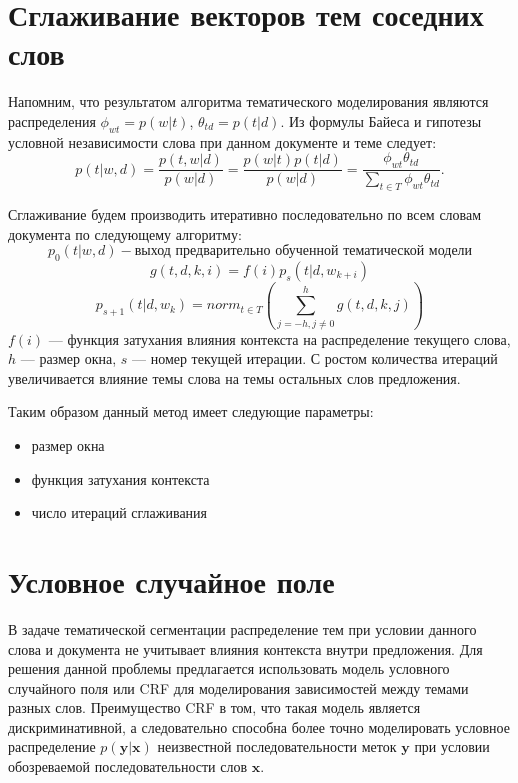 \documentclass[pdftex,ptm,12pt,a4paper]{report}
\theoremstyle{definition}
\begin{document}
\section{Сглаживание векторов тем соседних слов}\label{smooth}

Напомним, что результатом алгоритма тематического моделирования являются распределения $\phi_{wt} = p(w|t)$, $\theta_{td} = p(t|d)$. Из формулы Байеса и гипотезы условной независимости слова при данном документе и теме следует:
\[p(t|w, d) = \frac{p(t,w|d)}{p(w|d)} = \frac{p(w|t)p(t|d)}{p(w|d)} = \frac{\phi_{wt}\theta_{td}}{\sum_{t \in T}\phi_{wt}\theta_{td}}.
\]

Сглаживание будем производить итеративно последовательно по всем словам документа по следующему алгоритму:
\[p_0(t|w,d) - \text{выход предварительно обученной тематической модели}\]
\[g(t,d ,k,i) = f(i)p_s(t|d, w_{k + i})\]
\[p_{s + 1}(t|d, w_k) = norm_{t\in T}(\sum_{j=-h, j \ne 0}^{h}g(t,d,k,j))
\] 
$f(i)$ --- функция затухания влияния контекста на распределение текущего слова, $h$ --- размер окна, $s$ --- номер текущей итерации. С ростом количества итераций увеличивается влияние темы слова на темы остальных слов предложения.

Таким образом данный метод имеет следующие параметры:
\begin{itemize}
	\item размер окна
	\item функция затухания контекста
	\item число итераций сглаживания
	
\end{itemize}

\section{Условное случайное поле} \label{crf}
В задаче тематической сегментации распределение тем при условии данного слова и документа не учитывает влияния контекста внутри предложения. Для решения данной проблемы предлагается использовать модель условного случайного поля или CRF для моделирования зависимостей между темами разных слов. Преимущество CRF в том, что такая модель является дискриминативной, а следовательно способна более точно моделировать условное распределение $p(\boldsymbol{y}|\boldsymbol{x})$ неизвестной последовательности меток $\boldsymbol{y}$ при условии обозреваемой последовательности слов $\boldsymbol{x}$.  
\end{document}
